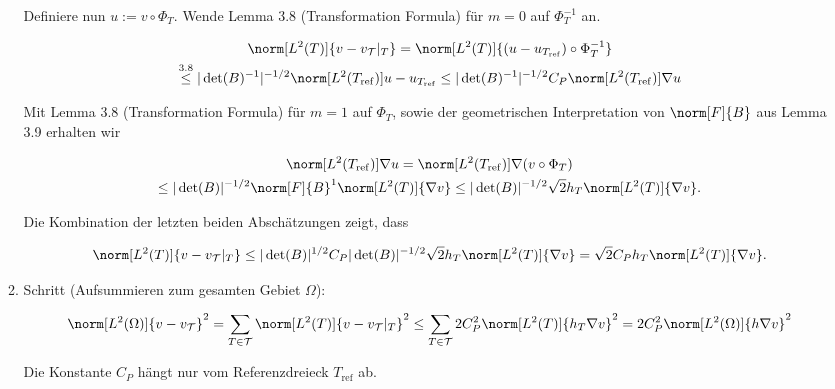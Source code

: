 \begin{solution}
\begin{enumerate}[label = \textbf{\alph*)}]
\begin{enumerate}[label = \arabic*.]

    Definiere nun $u := v \circ \Phi_T$.
    Wende Lemma 3.8 (Transformation Formula) für $m = 0$ auf $\Phi_T^{-1}$ an.
  
    \begin{multline*}
      \norm[L^2(T)]{v - v_\mathcal{T}|_T}
      =
      \norm[L^2(T)]{(u - u_{T_\mathrm{ref}}) \circ \Phi_T^{-1}} \\
      \stackrel
      {
        \mathrm{3.8}
      }{\leq}
      |\det(B)^{-1}|^{-1/2}
      \norm[L^2(T_\mathrm{ref})]{u - u_{T_\mathrm{ref}}}
      \leq
      |\det(B)^{-1}|^{-1/2}
      C_P
      \norm[L^2(T_\mathrm{ref})]{\nabla u}
    \end{multline*}
  
    Mit Lemma 3.8 (Transformation Formula) für $m = 1$ auf $\Phi_T$, sowie der geometrischen Interpretation von $\norm[F]{B}$ aus Lemma 3.9 erhalten wir
  
    \begin{multline*}
      \norm[L^2(T_\mathrm{ref})]{\nabla u}
      =
      \norm[L^2(T_\mathrm{ref})]{\nabla(v \circ \Phi_T)} \\
      \leq
      |\det(B)|^{-1/2}
      \norm[F]{B}^1
      \norm[L^2(T)]{\nabla v}
      \leq
      |\det(B)|^{-1/2}
      \sqrt{2}
      h_T
      \norm[L^2(T)]{\nabla v}.
    \end{multline*}
  
    Die Kombination der letzten beiden Abschätzungen zeigt, dass  

    \begin{align*}
      \norm[L^2(T)]{v - v_\mathcal{T}|_T}
      \leq
      |\det(B)|^{1/2} C_P |\det(B)|^{-1/2} \sqrt{2} h_T \norm[L^2(T)]{\nabla v}
      =
      \sqrt{2} C_P h_T \norm[L^2(T)]{\nabla v}.
    \end{align*}

    \item Schritt (Aufsummieren zum gesamten Gebiet $\Omega$):

    \begin{align*}
      \norm[L^2(\Omega)]{v - v_\mathcal{T}}^2
      =
      \sum_{T \in \mathcal{T}}
      \norm[L^2(T)]{v - v_\mathcal{T}|_T}^2
      \leq
      \sum_{T \in \mathcal{T}}
      2 C_P^2 \norm[L^2(T)]{h_T \nabla v}^2
      =
      2 C_P^2 \norm[L^2(\Omega)]{h \nabla v}^2
    \end{align*}
  
    Die Konstante $C_P$ hängt nur vom Referenzdreieck $T_\mathrm{ref}$ ab.


\end{enumerate}
\end{enumerate}
\end{solution}
